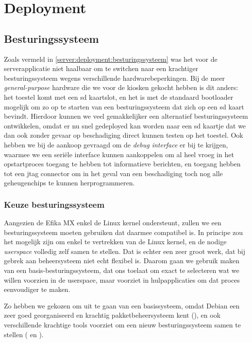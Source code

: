 \chapter{Deployment}
\label{kiosk:deployment}

\section{Besturingssysteem}
\label{kiosk:deployment:besturingssysteem}

Zoals vermeld in \ref{server:deployment:besturingssysteem} was het voor de serverapplicatie niet haalbaar om te switchen naar een krachtiger besturingssysteem wegens verschillende hardwarebeperkingen. Bij de meer \emph{general-purpose} hardware die we voor de kiosken gekocht hebben is dit anders: het toestel komt met een \ac{sd} kaartslot, en het is met de standaard bootloader mogelijk om zo op te starten van een besturingssysteem dat zich op een \ac{sd} kaart bevindt. Hierdoor kunnen we veel gemakkelijker een alternatief besturingssysteem ontwikkelen, omdat er nu snel gedeployed kan worden naar een \ac{sd} kaartje dat we dan ook zonder gevaar op beschadiging direct kunnen testen op het toestel. Ook hebben we bij de aankoop gevraagd om de \emph{debug interface} er bij te krijgen, waarmee we een seriële interface kunnen aankoppelen om al heel vroeg in het opstartproces toegang te hebben tot informatieve berichten, en toegang hebben tot een \ac{jtag} connector om in het geval van een beschadiging toch nog alle geheugenchips te kunnen herprogrammeren.

\subsection{Keuze besturingssysteem}
\label{kiosk:deployment:besturingssysteem:keuze}

Aangezien de Efika MX enkel de Linux kernel ondersteunt, zullen we een besturingssysteem moeten gebruiken dat daarmee compatibel is. In principe zou het mogelijk zijn om enkel te vertrekken van de Linux kernel, en de nodige \emph{userspace} volledig zelf samen te stellen. Dat is echter een zeer groot werk, dat bij gebrek aan beheersysteem niet echt flexibel is. Daarom gaan we gebruik maken van een basis-besturingssysteem, dat ons toelaat om exact te selecteren wat we willen voorzien in de userspace, maar voorziet in hulpapplicaties om dat proces eenvoudiger te maken.

Zo hebben we gekozen om uit te gaan van een  basissysteem, omdat Debian een zeer goed georganiseerd en krachtig pakketbeheersysteem kent (), en ook verschillende krachtige tools voorziet om een nieuw besturingssysteem samen te stellen ( en ).


